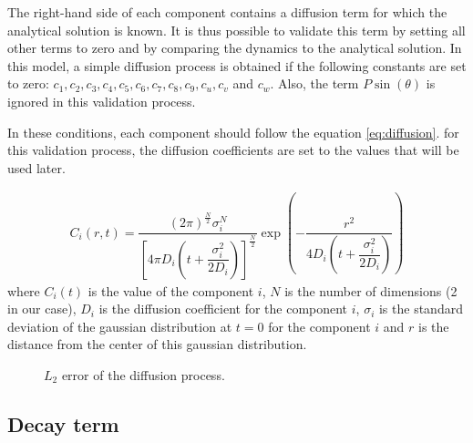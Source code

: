 \documentclass[a4paper]{article}
\begin{document}
The right-hand side of each component contains a diffusion term for which the analytical solution is known. It is thus possible to validate this term by setting all other terms to zero and by comparing the dynamics to the analytical solution. In this model, a simple diffusion process is obtained if the following constants are set to zero: $c_1, c_2, c_3, c_4, c_5, c_6, c_7, c_8, c_9, c_u, c_v$ and $c_w$.
Also, the term $P \sin (\theta)$ is ignored in this validation process.

In these conditions, each component should follow the equation \ref{eq:diffusion}. for this validation process, the diffusion coefficients are set to the values that will be used later.

\begin{align}
\label{eq:diffusion}
	C_i(r, t)= \dfrac{ \left( 2 \pi \right) ^\frac{N}{2} \sigma^N_i }{ \left[ 4 \pi D_i \left( t + \dfrac{\sigma^2_i}{2D_i} \right) \right]^\frac{N}{2} } \exp \left(- \dfrac{r^2}{4 D_i \left ( t+ \dfrac{\sigma^2_i}{2D_i} \right) } \right)
\end{align}
where $C_i(t)$ is the value of the component $i$, $N$ is the number of dimensions (2 in our case), $D_i$ is the diffusion coefficient for the component $i$, $\sigma_i$ is the standard deviation of the gaussian distribution at $t=0$ for the component $i$ and $r$ is the distance from the center of this gaussian distribution.

\begin{figure}
\caption{$L_2$ error of the diffusion process.}
\end{figure}


\subsection{Decay term}
\end{document}
